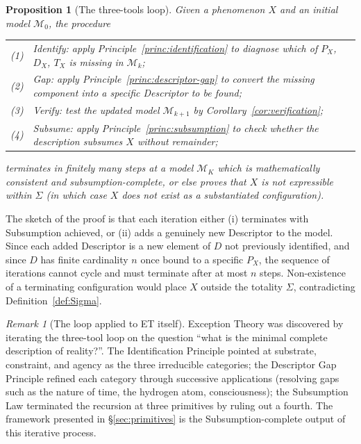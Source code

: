 \documentclass[11pt,a4paper]{article}
\newtheorem{proposition}[theorem]{Proposition}
\theoremstyle{definition}
\theoremstyle{remark}
\newtheorem{remark}[theorem]{Remark}
\begin{document}
\begin{proposition}[The three-tools loop]\label{prop:loop}
Given a phenomenon $X$ and an initial model $\mathcal{M}_{0}$, the procedure
\begin{center}
\begin{tabular}{rl}
(1) & Identify: apply Principle~\ref{princ:identification} to diagnose which of $P_{X}$, $D_{X}$, $T_{X}$ is missing in $\mathcal{M}_{k}$;\\
(2) & Gap: apply Principle~\ref{princ:descriptor-gap} to convert the missing component into a specific Descriptor to be found;\\
(3) & Verify: test the updated model $\mathcal{M}_{k+1}$ by Corollary~\ref{cor:verification};\\
(4) & Subsume: apply Principle~\ref{princ:subsumption} to check whether the description subsumes $X$ without remainder;
\end{tabular}
\end{center}
terminates in finitely many steps at a model $\mathcal{M}_{K}$ which is mathematically consistent and subsumption-complete, or else proves that $X$ is not expressible within $\Sigma$ (in which case $X$ does not exist as a substantiated configuration).
\end{proposition}

The sketch of the proof is that each iteration either (i) terminates with Subsumption achieved, or (ii) adds a genuinely new Descriptor to the model. Since each added Descriptor is a new element of $D$ not previously identified, and since $D$ has finite cardinality $n$ once bound to a specific $P_{X}$, the sequence of iterations cannot cycle and must terminate after at most $n$ steps. Non-existence of a terminating configuration would place $X$ outside the totality $\Sigma$, contradicting Definition~\ref{def:Sigma}.

\begin{remark}[The loop applied to ET itself]
Exception Theory was discovered by iterating the three-tool loop on the question ``what is the minimal complete description of reality?''. The Identification Principle pointed at substrate, constraint, and agency as the three irreducible categories; the Descriptor Gap Principle refined each category through successive applications (resolving gaps such as the nature of time, the hydrogen atom, consciousness); the Subsumption Law terminated the recursion at three primitives by ruling out a fourth. The framework presented in \S\ref{sec:primitives} is the Subsumption-complete output of this iterative process.
\end{remark}
\end{document}
